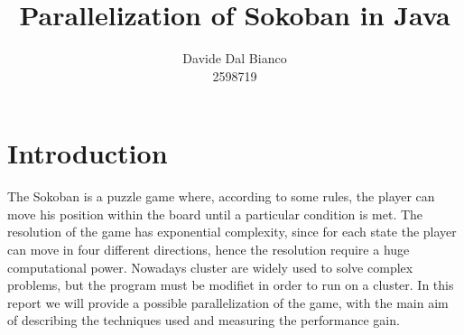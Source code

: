 \documentclass{article}
\title{Parallelization of Sokoban in Java}
\author{Davide Dal Bianco \\ 2598719}
\begin{document}
\maketitle

\section{Introduction}
The Sokoban is a puzzle game where, according to some rules, the player can move his position within the board until a particular condition is met. The resolution of the game has exponential complexity, since for each state the player can move in four different directions, hence the resolution require a huge computational power. Nowadays cluster are widely used to solve complex problems, but the program must be modifiet in order to run on a cluster. In this report we will provide a possible parallelization of the game, with the main aim of describing the techniques used and measuring the performance gain.
\end{document}
